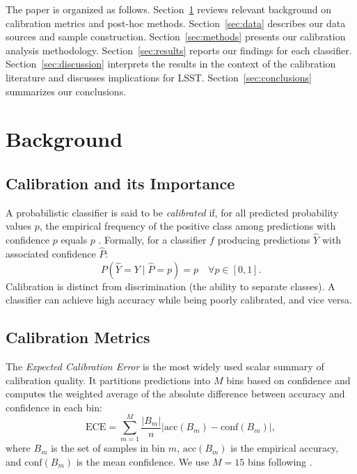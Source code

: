 \documentclass[twocolumn]{aastex631}
\begin{document}
The paper is organized as follows. Section~\ref{sec:background} reviews relevant background on calibration metrics and post-hoc methods. Section~\ref{sec:data} describes our data sources and sample construction. Section~\ref{sec:methods} presents our calibration analysis methodology. Section~\ref{sec:results} reports our findings for each classifier. Section~\ref{sec:discussion} interprets the results in the context of the calibration literature and discusses implications for LSST. Section~\ref{sec:conclusions} summarizes our conclusions.


\section{Background} \label{sec:background}

\subsection{Calibration and its Importance}

A probabilistic classifier is said to be \emph{calibrated} if, for all predicted probability values $p$, the empirical frequency of the positive class among predictions with confidence $p$ equals $p$ \citep{dawid1982}. Formally, for a classifier $f$ producing predictions $\hat{Y}$ with associated confidence $\hat{P}$:
\begin{equation}
P(\hat{Y} = Y \mid \hat{P} = p) = p \quad \forall p \in [0,1].
\end{equation}
Calibration is distinct from discrimination (the ability to separate classes). A classifier can achieve high accuracy while being poorly calibrated, and vice versa.

\subsection{Calibration Metrics}

The \emph{Expected Calibration Error} \citep[ECE;][]{naeini2015} is the most widely used scalar summary of calibration quality. It partitions predictions into $M$ bins based on confidence and computes the weighted average of the absolute difference between accuracy and confidence in each bin:
\begin{equation}
\text{ECE} = \sum_{m=1}^{M} \frac{|B_m|}{n} \left| \text{acc}(B_m) - \text{conf}(B_m) \right|,
\end{equation}
where $B_m$ is the set of samples in bin $m$, $\text{acc}(B_m)$ is the empirical accuracy, and $\text{conf}(B_m)$ is the mean confidence. We use $M = 15$ bins following \citet{guo2017}.
\end{document}
